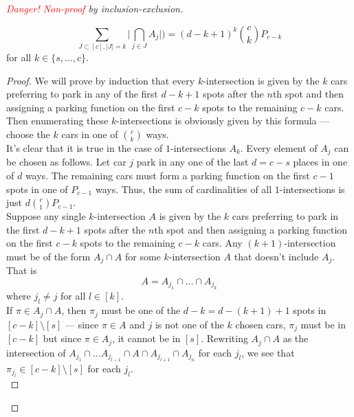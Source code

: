 \begin{proof}[\textcolor{red}{Danger! Non-proof} by inclusion-exclusion]
	\begin{lemma}
		\[
		\sum_{J \subset [c], \lvert J \rvert = k} \lvert \bigcap_{j \in J} A_{j} \rvert) = (d - k + 1)^{k} \binom{c}{k} P_{c - k}
	\]
	for all $k \in \{ s, \dots, c \}$.
	\end{lemma}

	\begin{proof}
		We will prove by induction that every $k$-intersection is given by the $k$ cars preferring to park in any of the first $d - k + 1$ spots after the $n$th spot and then assigning a parking function on the first $c - k$ spots to the remaining $c - k$ cars. Then enumerating these $k$-intersections is obviously given by this formula --- choose the $k$ cars in one of $\binom{c}{k}$ ways. \\

		It's clear that it is true in the case of $1$-intersections $A_{k}$. Every element of $A_{j}$ can be chosen as follows. Let car $j$ park in any one of the last $d = c - s$ places in one of $d$ ways. The remaining cars must form a parking function on the first $c - 1$ spots in one of $P_{c - 1}$ ways. Thus, the sum of cardinalities of all $1$-intersections is just $d \binom{c}{1} P_{c - 1}$. \\

		Suppose any single $k$-intersection $A$ is given by the $k$ cars preferring to park in the first $d - k + 1$ spots after the $n$th spot and then assigning a parking function on the first $c - k$ spots to the remaining $c - k$ cars. Any $(k + 1)$-intersection must be of the form $A_{j} \cap A$ for some $k$-intersection $A$ that doesn't include $A_{j}$. That is
		\[
			A = A_{j_{1}} \cap \dots \cap A_{j_{k}}
		\]
		where $j_{l} \neq j$ for all $l \in [k]$. \\

		If $\pi \in A_{j} \cap A$, then $\pi_{j}$ must be one of the $d - k = d - (k + 1) + 1$ spots in $[c - k] \setminus [s]$ --- since $\pi \in A$ and $j$ is not one of the $k$ chosen cars, $\pi_{j}$ must be in $[c - k]$ but since $\pi \in A_{j}$, it cannot be in $[s]$. Rewriting $A_{j} \cap A$ as the intersection of $A_{j_{1}} \cap \dots A_{j_{l - 1}} \cap A \cap A_{j_{l + 1}} \cap A_{j_{n}}$ for each $j_{l}$, we see that $\pi_{j_{l}} \in [c - k] \setminus [s]$ for each $j_{l}$. \\
		

\end{proof}
\end{proof}
